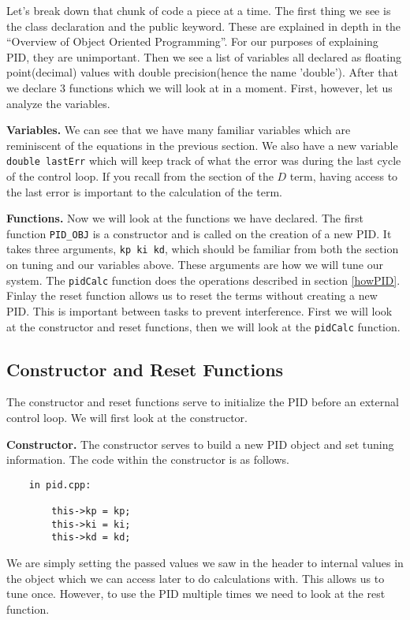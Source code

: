\documentclass[12pt]{article}
\begin{document}
    Let's break down that chunk of code a piece at a time. The first thing we see is the class declaration and the public keyword. These are explained in depth in the ``Overview of Object Oriented Programming''. For our purposes of explaining PID, they are unimportant. Then we see a list of variables all declared as floating point(decimal) values with double precision(hence the name 'double'). After that we declare 3 functions which we will look at in a moment. First, however, let us analyze the variables.

   \textbf{Variables.} We can see that we have many familiar variables which are reminiscent of the equations in the previous section. We also have a new variable \verb|double lastErr| which will keep track of what the error was during the last cycle of the control loop. If you recall from the section of the $D$ term, having access to the last error is important to the calculation of the term.

    \textbf{Functions.} Now we will look at the functions we have declared. The first function \verb|PID_OBJ| is a constructor and is called on the creation of a new PID. It takes three arguments, \verb|kp ki kd|, which should be familiar from both the section on tuning and our variables above. These arguments are how we will tune our system. The \verb|pidCalc| function does the operations described in section \ref{howPID}. Finlay the reset function allows us to reset the terms without creating a new PID. This is important between tasks to prevent interference. First we will look at the constructor and reset functions, then we will look at the \verb|pidCalc| function.

\subsection{Constructor and Reset Functions}
    The constructor and reset functions serve to initialize the PID before an external control loop. We will first look at the constructor.

    \textbf{Constructor.} The constructor serves to build a new PID object and set tuning information. The code within the constructor is as follows.

    \begin{verbatim}
    in pid.cpp:

        this->kp = kp;
        this->ki = ki;
        this->kd = kd;
    \end{verbatim}

    We are simply setting the passed values we saw in the header to internal values in the object which we can access later to do calculations with. This allows us to tune once. However, to use the PID multiple times we need to look at the rest function.
\end{document}
